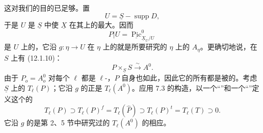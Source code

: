 这对我们的目的已足够。置
\[
 U=\underline S-\operatorname{supp}D,\tag{12.8.4}
\]
于是 $U$ 是 $\underline S$ 中使 $\underline X$ 在其上的最大。因而
\[
 P|U=\underline{\operatorname{Pic}}_{\underline X_U/U}^{0}
\]
是 $U$ 上的，它沿 $g:\eta\to U$ 在 $\eta$ 上的就是所要研究的 $\eta$ 上的 $A_\eta$。更确切地说，在 $S$ 上有 (12.1.10)：
\[
 P\times_{\underline S}S\xrightarrow\sim A^0.\tag{12.8.5}
\]
由于 $P_o=A_o^0$ 对每个 $\ell$ 都是 $\ell$-，$P$ 自身也如此，因此它的所有都是被的。考虑 $\underline S$ 上的 $T_\ell(P)$；它沿 $g$ 的正是 $T_\ell(A^0)$。应用 7.3 的构造，以一个“”和一个“”定义这个的
\[
 T_\ell(P)\supset T_\ell(P)^f=T_\ell(\widehat P)
 \supset T_\ell(P)^t=T_\ell(T)\supset0.\tag{12.8.6}
\]
它沿 $g$ 的是第 2、5 节中研究过的 $T_\ell(A^0)$ 的相应。

